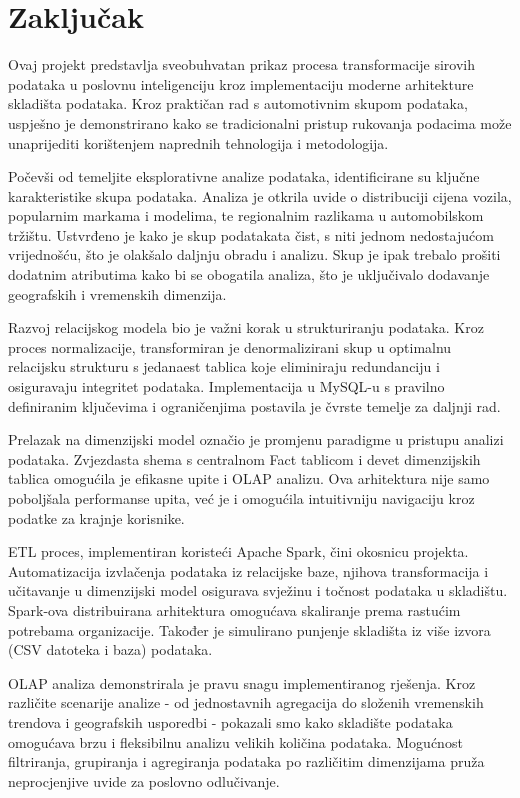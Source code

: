 \section{Zaključak}

Ovaj projekt predstavlja sveobuhvatan prikaz procesa transformacije sirovih podataka u poslovnu inteligenciju kroz implementaciju moderne arhitekture skladišta podataka. Kroz praktičan rad s automotivnim skupom podataka, uspješno je demonstrirano kako se tradicionalni pristup rukovanja podacima može unaprijediti korištenjem naprednih tehnologija i metodologija.

Počevši od temeljite eksplorativne analize podataka, identificirane su ključne karakteristike skupa podataka. Analiza je otkrila uvide o distribuciji cijena vozila, popularnim markama i modelima, te regionalnim razlikama u automobilskom tržištu. Ustvrđeno je kako je skup podatakata čist, s niti jednom nedostajućom vrijednošću, što je olakšalo daljnju obradu i analizu. Skup je ipak trebalo prošiti dodatnim atributima kako bi se obogatila analiza, što je uključivalo dodavanje geografskih i vremenskih dimenzija.

Razvoj relacijskog modela bio je važni korak u strukturiranju podataka. Kroz proces normalizacije, transformiran je denormalizirani skup u optimalnu relacijsku strukturu s jedanaest tablica koje eliminiraju redundanciju i osiguravaju integritet podataka. Implementacija u MySQL-u s pravilno definiranim ključevima i ograničenjima postavila je čvrste temelje za daljnji rad.

Prelazak na dimenzijski model označio je promjenu paradigme u pristupu analizi podataka. Zvjezdasta shema s centralnom Fact tablicom i devet dimenzijskih tablica omogućila je efikasne upite i OLAP analizu. Ova arhitektura nije samo poboljšala performanse upita, već je i omogućila intuitivniju navigaciju kroz podatke za krajnje korisnike.

ETL proces, implementiran koristeći Apache Spark, čini okosnicu projekta. Automatizacija izvlačenja podataka iz relacijske baze, njihova transformacija i učitavanje u dimenzijski model osigurava svježinu i točnost podataka u skladištu. Spark-ova distribuirana arhitektura omogućava skaliranje prema rastućim potrebama organizacije. Također je simulirano punjenje skladišta iz više izvora (CSV datoteka i baza) podataka.

OLAP analiza demonstrirala je pravu snagu implementiranog rješenja. Kroz različite scenarije analize - od jednostavnih agregacija do složenih vremenskih trendova i geografskih usporedbi - pokazali smo kako skladište podataka omogućava brzu i fleksibilnu analizu velikih količina podataka. Mogućnost filtriranja, grupiranja i agregiranja podataka po različitim dimenzijama pruža neprocjenjive uvide za poslovno odlučivanje.

